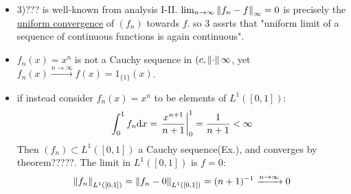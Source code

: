 \documentclass{article}
\begin{document}
\begin{remark}
	\begin{itemize}
		\item 3)??? is well-known from analysis I-II. $\lim_{n\to\infty}\left\|{f_n-f}\right\|_\infty=0$ is precisely the \underline{uniform convergence} of $(f_n)$ towards $f$. so 3 assrts that "uniform limit of a sequence of continuous functions is again continuous".
		\item $f_n(x)=x^n$ is not a Cauchy sequence in $(c,\left\|{\cdot}\right\|\infty$, yet $f_n(x)\xrightarrow{n\to\infty} f(x)=1_{\{1\}}(x)$.
		\item if instead consider $f_n(x)=x^n$ to be elements of $L^1([0,1])$:
		      $$\int_0^1f_n{\rm d}x=\left.\frac{x^{n+1}}{n+1}\right|^1_0=\frac{1}{n+1}<\infty$$
		      Then $(f_n)\subset L^1([0,1])$ a Cauchy sequence(Ex.), and converges by theorem?????. The limit in $L^1([0,1])$ is $f=0$:
		      $$\left\|{f_n}\right\|_{L^1([0,1])}=\left\|{f_n-0}\right\|_{L^1([0,1])}=(n+1)^{-1}\xrightarrow{n\to\infty}0$$
	\end{itemize}

\end{remark}
\end{document}
